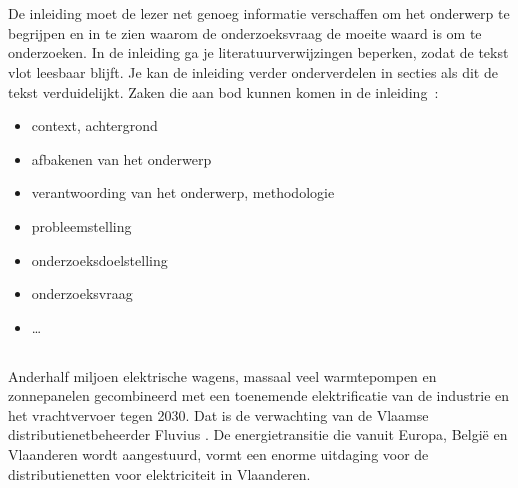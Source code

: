 
\chapter{}%
\label{ch:inleiding}

De inleiding moet de lezer net genoeg informatie verschaffen om het onderwerp te begrijpen en in te zien waarom de onderzoeksvraag de moeite waard is om te onderzoeken. In de inleiding ga je literatuurverwijzingen beperken, zodat de tekst vlot leesbaar blijft. Je kan de inleiding verder onderverdelen in secties als dit de tekst verduidelijkt. Zaken die aan bod kunnen komen in de inleiding~\autocite{Pollefliet2011}:

\begin{itemize}
  \item context, achtergrond
  \item afbakenen van het onderwerp
  \item verantwoording van het onderwerp, methodologie
  \item probleemstelling
  \item onderzoeksdoelstelling
  \item onderzoeksvraag
  \item \ldots
\end{itemize}

\section{}%
\label{sec:probleemstelling}


Anderhalf miljoen elektrische wagens, massaal veel warmtepompen en zonnepanelen gecombineerd met een toenemende elektrificatie van de industrie en het vrachtvervoer tegen 2030. Dat is de verwachting van de Vlaamse distributienetbeheerder Fluvius \autocite{Verdoodt2022}. De energietransitie die vanuit Europa, België en Vlaanderen wordt aangestuurd, vormt een enorme uitdaging voor de distributienetten voor elektriciteit in Vlaanderen. \\

